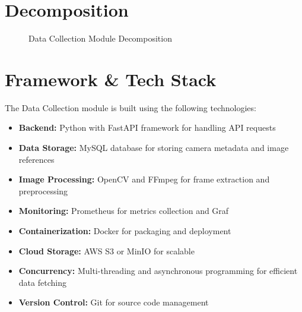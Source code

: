 \section{Decomposition}

\begin{figure}[H]
    \centering
    \caption{Data Collection Module Decomposition}
    \label{fig:data-collection-overview}
\end{figure}

\section{Framework \& Tech Stack}
The Data Collection module is built using the following technologies:
\begin{itemize}
    \item \textbf{Backend:} Python with FastAPI framework for handling API requests
    \item \textbf{Data Storage:} MySQL database for storing camera metadata and image references
    \item \textbf{Image Processing:} OpenCV and FFmpeg for frame extraction and preprocessing
    \item \textbf{Monitoring:} Prometheus for metrics collection and Graf
    \item \textbf{Containerization:} Docker for packaging and deployment
    \item \textbf{Cloud Storage:} AWS S3 or MinIO for scalable
    \item \textbf{Concurrency:} Multi-threading and asynchronous programming for efficient data fetching
    \item \textbf{Version Control:} Git for source code management
\end{itemize}

